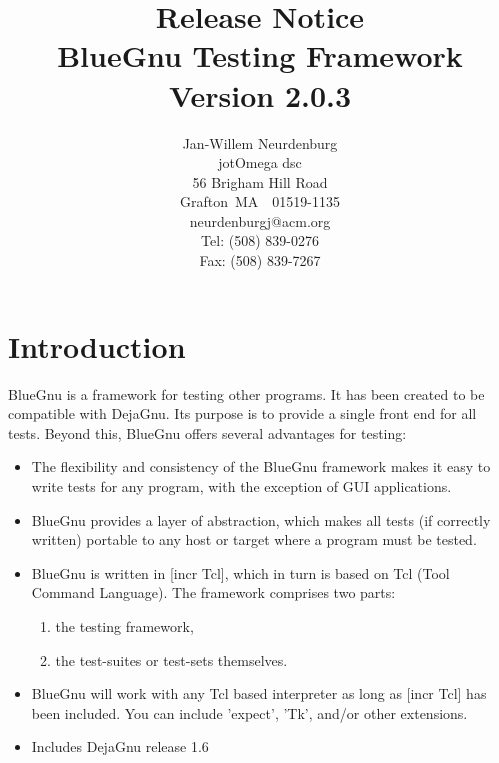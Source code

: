 


\title{Release Notice\\BlueGnu Testing Framework\\
Version 2.0.3}
\author{Jan-Willem Neurdenburg\\jotOmega dsc\\
56 Brigham Hill Road\\Grafton~MA~~01519-1135\\
neurdenburgj@acm.org\\Tel: (508) 839-0276\\Fax: (508) 839-7267}

\maketitle

\section{Introduction}
BlueGnu is a framework for testing other programs. It has been created
to be compatible with DejaGnu. Its purpose is to provide a single
front end for all tests. Beyond this, BlueGnu offers several
advantages for testing:

\begin{itemize}

\item The flexibility and consistency of the BlueGnu framework makes it
easy to write tests for any program, with the exception of GUI
applications.

\item BlueGnu provides a layer of abstraction, which makes all tests
(if correctly written) portable to any host or target where a program
must be tested.

\item BlueGnu is written in [incr Tcl], which in turn is based on Tcl
(Tool Command Language). The framework comprises two parts:
\begin{enumerate}
\item the testing framework,
\item the test-suites or test-sets themselves.
\end{enumerate}

\item BlueGnu will work with any Tcl based interpreter as long as
[incr Tcl] has been included. You can include 'expect', 'Tk', and/or
other extensions.

\item Includes DejaGnu release 1.6

\end{itemize}

